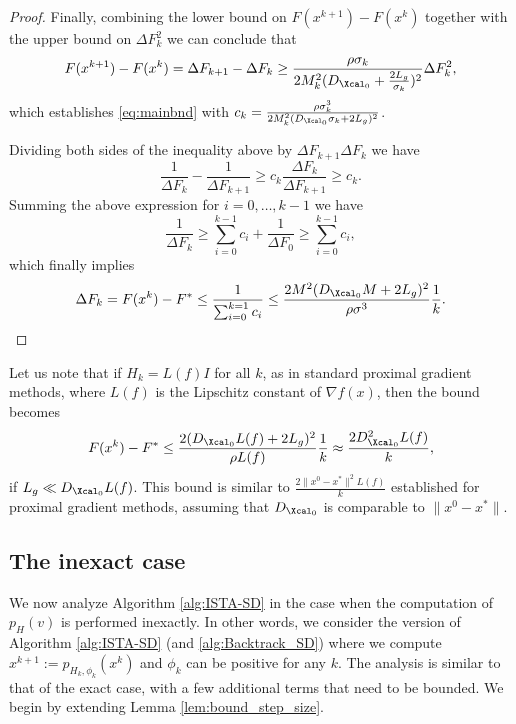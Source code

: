 \documentclass[11pt]{article}
\numberwithin{equation}{section}
\begin{document}
\begin{proof}
	Finally, combining the lower bound on $F(x^{k+1})-F(x^k)$ together with the upper bound on $\Delta F_k^2$  we can conclude that
	\[
	F(x^{k+1})-F(x^k)=\Delta F_{k+1}-\Delta F_k\geq  \frac{\rho\sigma_k}{2M_k^2 (D_{\Xcal_0}+\frac{2L_g}{\sigma_k})^2}\Delta F_k^2,
	\]
	which establishes \eqref{eq:mainbnd} with $c_k= \frac{\rho\sigma_k^3}{2M_k^2 (D_{\Xcal_0}\sigma_k+2L_g)^2}$. 

	Dividing both sides of the inequality above  by $\Delta F_{k+1}\Delta F_k$ we have
	\[
	\frac{1}{\Delta F_{k}}-\frac{1}{\Delta F_{k+1}}\geq c_k\frac{\Delta F_{k}}{\Delta F_{k+1}}\geq c_k.
	\]
	Summing the above expression for  $i=0, \ldots, k-1$ we have
	\[
	\frac{1}{\Delta F_{k}}\geq \sum_{i=0}^{k-1}c_i+\frac{1}{\Delta F_{0}} \geq \sum_{i=0}^{k-1}c_i,
	\]
	which finally implies
	\[
	\Delta F_k=F(x^k)-F^*\leq \frac{1}{\sum_{i=0}^{k=1} c_i} \leq  \frac{2M^2 (D_{\Xcal_0}M+2L_g)^2}{\rho\sigma^3}\frac{1}{k}.
	\]
\end{proof}

Let us note that if $H_k=L(f)I$ for all $k$, as in standard proximal gradient methods, where $L(f)$ is the Lipschitz constant of $\nabla f(x)$, then
the bound becomes
\[
F(x^k)-F^*\leq   \frac{ 2(D_{\Xcal_0}L(f)+2L_g)^2}{\rho L(f)}\frac{1}{k}\approx \frac{ 2D_{\Xcal_0}^2L(f)}{k},
\]
if $L_g\ll D_{\Xcal_0}L(f)$. This  bound is similar to $\frac{2\|x^0-x^*\|^2L(f)}{k}$ established for proximal gradient methods, assuming that $D_{\Xcal_0}$ is comparable to
$\|x^0-x^*\|$. 


\subsection{The inexact case} %
\label{sec:conv_inexact}

We now  analyze Algorithm \ref{alg:ISTA-SD}  in the case when the computation of $p_H( v)$ is performed inexactly. 
In other words, we consider the version of Algorithm \ref{alg:ISTA-SD} (and \ref{alg:Backtrack_SD}) where we compute 
$x^{k+1}  := p_{H_k, \phi_k}(x^k)$ and $\phi_k$ can be positive for any $k$. The analysis is similar to that of the exact case, with a few additional terms that need to be bounded. We begin by extending Lemma \ref{lem:bound_step_size}.
\end{document}
